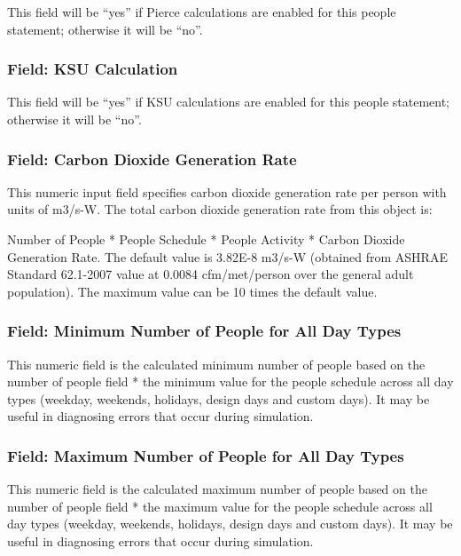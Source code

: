This field will be ``yes'' if Pierce calculations are enabled for this people statement; otherwise it will be ``no''.

\subsubsection{Field: KSU Calculation}\label{field-ksu-calculation}

This field will be ``yes'' if KSU calculations are enabled for this people statement; otherwise it will be ``no''.

\subsubsection{Field: Carbon Dioxide Generation Rate}\label{field-carbon-dioxide-generation-rate}

This numeric input field specifies carbon dioxide generation rate per person with units of m3/s-W. The total carbon dioxide generation rate from this object is:

Number of People * People Schedule * People Activity * Carbon Dioxide Generation Rate. The default value is 3.82E-8 m3/s-W (obtained from ASHRAE Standard 62.1-2007 value at 0.0084 cfm/met/person over the general adult population). The maximum value can be 10 times the default value.

\subsubsection{Field: Minimum Number of People for All Day Types}\label{field-minimum-number-of-people-for-all-day-types}

This numeric field is the calculated minimum number of people based on the number of people field * the minimum value for the people schedule across all day types (weekday, weekends, holidays, design days and custom days). It may be useful in diagnosing errors that occur during simulation.

\subsubsection{Field: Maximum Number of People for All Day Types}\label{field-maximum-number-of-people-for-all-day-types}

This numeric field is the calculated maximum number of people based on the number of people field * the maximum value for the people schedule across all day types (weekday, weekends, holidays, design days and custom days). It may be useful in diagnosing errors that occur during simulation.

